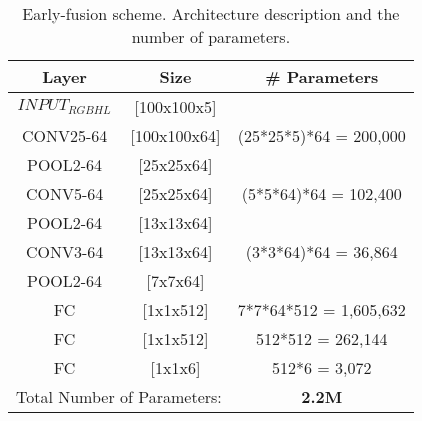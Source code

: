 \documentclass[review,12pt,3p]{elsarticle}
\begin{document}
\begin{table}[!ht]
\centering
\scriptsize
\begin{tabular}{  c  c | c} 

         Layer&  Size     & \# Parameters \\
               \hline
$INPUT_{RGBHL}$&     [100x100x5]  		&     \\
CONV25-64& [100x100x64] 		&   (25*25*5)*64 	  =      200,000\\
POOL2-64&  [25x25x64] &	\\
CONV5-64&  [25x25x64] 			&   (5*5*64)*64 	  =      102,400\\
POOL2-64&  [13x13x64] &	\\
CONV3-64&  [13x13x64] 			&   (3*3*64)*64 	  =       36,864\\
POOL2-64&  [7x7x64] 			&   \\
FC&         [1x1x512] 			&   7*7*64*512   	  =    1,605,632\\
FC&         [1x1x512] 			&   512*512 	          =      262,144\\
FC&         [1x1x6]		    	&   512*6 	  	  =        3,072\\   
\hline
\multicolumn{2}{c}{ Total Number of Parameters:} & \textbf{2.2M} \\

\end{tabular}
\caption{Early-fusion scheme. Architecture description and the number of parameters.}
\label{tab:earlyStyle}
\end{table}
\end{document}
